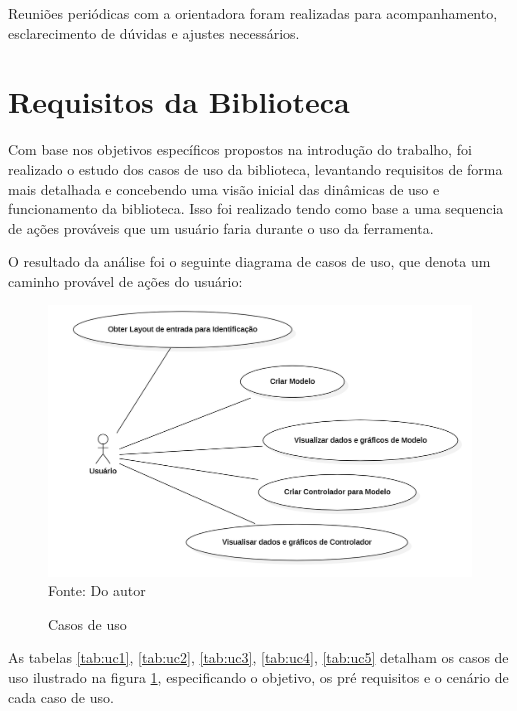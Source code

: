 Reuniões periódicas com a orientadora foram realizadas para acompanhamento, esclarecimento de dúvidas e ajustes
necessários.

\section{Requisitos da Biblioteca}

Com base nos objetivos específicos propostos na introdução do trabalho, foi realizado o estudo dos casos de uso da
biblioteca, levantando requisitos de forma mais detalhada e concebendo uma visão inicial das dinâmicas de uso e
funcionamento da biblioteca.
Isso foi realizado tendo como base a uma sequencia de ações prováveis que um usuário faria durante o uso da ferramenta.

O resultado da análise foi o seguinte diagrama de casos de uso, que denota um caminho provável de ações do usuário:

\begin{figure}[H]
    \centering
    \caption{Casos de uso}
    \includegraphics[scale=0.5]{figuras/use_cases}
    \label{fig:use_cases}
    \\
    \vspace{0cm}\hspace{0cm}\small{Fonte: Do autor}
\end{figure}

As tabelas \ref{tab:uc1}, \ref{tab:uc2}, \ref{tab:uc3}, \ref{tab:uc4}, \ref{tab:uc5} detalham os casos de uso ilustrado
na figura \ref{fig:use_cases}, especificando o objetivo, os pré requisitos e o cenário de cada caso de uso.



